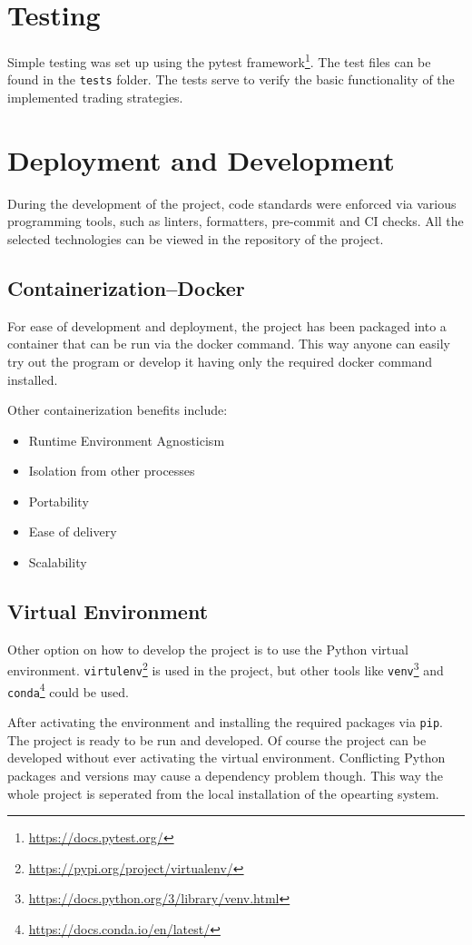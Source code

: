 \section{Testing}
Simple testing was set up using the pytest framework\footnote{\url{https://docs.pytest.org/}}. The test files can be found in the \texttt{tests} folder. The tests serve to verify the basic functionality of the implemented trading strategies.

\section{Deployment and Development}
During the development of the project, code standards were enforced via various programming tools, such as linters, formatters, pre-commit and CI checks. All the selected technologies can be viewed in the repository of the project.

\subsection*{Containerization--Docker}
For ease of development and deployment, the project has been packaged into a container that can be run via the docker command. This way anyone can easily try out the program or develop it having only the required docker command installed.

Other containerization benefits include:
\begin{itemize}
    \item Runtime Environment Agnosticism
    \item Isolation from other processes
    \item Portability
    \item Ease of delivery
    \item Scalability
\end{itemize}

\subsection*{Virtual Environment}
Other option on how to develop the project is to use the Python virtual environment. \texttt{virtulenv}\footnote{\url{https://pypi.org/project/virtualenv/}} is used in the project, but other tools like \texttt{venv}\footnote{\url{https://docs.python.org/3/library/venv.html}} and \texttt{conda}\footnote{\url{https://docs.conda.io/en/latest/}} could be used.

After activating the environment and installing the required packages via \texttt{pip}. The project is ready to be run and developed. Of course the project can be developed without ever activating the virtual environment. Conflicting Python packages and versions may cause a dependency problem though. This way the whole project is seperated from the local installation of the opearting system.

